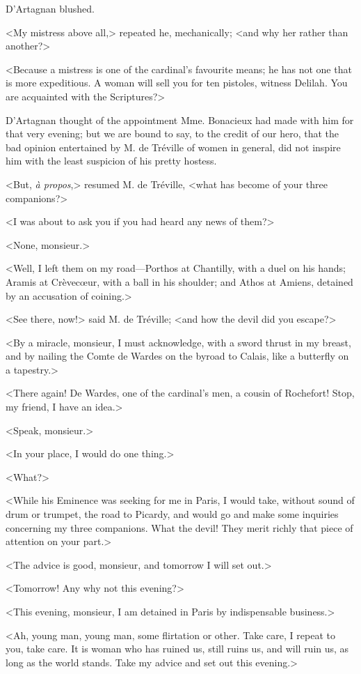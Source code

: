 D'Artagnan blushed. 

<My mistress above all,> repeated he, mechanically; <and why her rather than another?> 

<Because a mistress is one of the cardinal's favourite means; he has not one that is more expeditious. A woman will sell you for ten pistoles, witness Delilah. You are acquainted with the Scriptures?> 

D'Artagnan thought of the appointment Mme. Bonacieux had made with him for that very evening; but we are bound to say, to the credit of our hero, that the bad opinion entertained by M. de Tréville of women in general, did not inspire him with the least suspicion of his pretty hostess. 

<But, \textit{à propos},> resumed M. de Tréville, <what has become of your three companions?> 

<I was about to ask you if you had heard any news of them?> 

<None, monsieur.> 

<Well, I left them on my road---Porthos at Chantilly, with a duel on his hands; Aramis at Crèvecœur, with a ball in his shoulder; and Athos at Amiens, detained by an accusation of coining.> 

<See there, now!> said M. de Tréville; <and how the devil did you escape?> 

<By a miracle, monsieur, I must acknowledge, with a sword thrust in my breast, and by nailing the Comte de Wardes on the byroad to Calais, like a butterfly on a tapestry.> 

<There again! De Wardes, one of the cardinal's men, a cousin of Rochefort! Stop, my friend, I have an idea.> 

<Speak, monsieur.> 

<In your place, I would do one thing.> 

<What?> 

<While his Eminence was seeking for me in Paris, I would take, without sound of drum or trumpet, the road to Picardy, and would go and make some inquiries concerning my three companions. What the devil! They merit richly that piece of attention on your part.> 

<The advice is good, monsieur, and tomorrow I will set out.> 

<Tomorrow! Any why not this evening?> 

<This evening, monsieur, I am detained in Paris by indispensable business.> 

<Ah, young man, young man, some flirtation or other. Take care, I repeat to you, take care. It is woman who has ruined us, still ruins us, and will ruin us, as long as the world stands. Take my advice and set out this evening.> 

